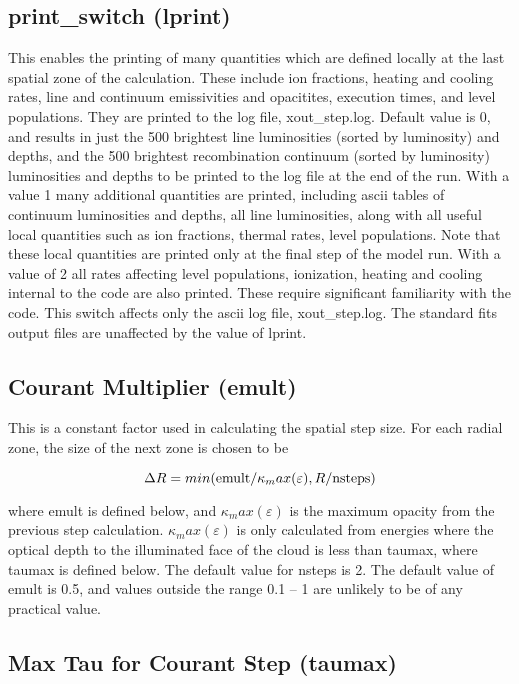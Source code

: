 \subsection{print\_switch (lprint)} This enables 
the printing of many quantities which are defined locally at the last 
spatial zone of the calculation.  These include ion fractions, heating and cooling 
rates, line and continuum emissivities and opacitites, execution times, 
and level populations.  They are printed to the log file, xout\_step.log.
Default value is 0, and results in just the 500 brightest line luminosities (sorted by luminosity) and depths, 
and the 500 brightest recombination continuum (sorted by luminosity)
luminosities and depths to be printed to the log file at the end of the run. With a value 1 many 
additional quantities are printed, including ascii tables of continuum luminosities and depths, 
all line luminosities, along with all useful local quantities such as ion fractions, thermal 
rates, level populations.  Note that these local quantities are printed only at the final step of 
the model run.  With a value of 2 all rates affecting level populations, ionization, heating and 
cooling internal to the code are also printed.  These require significant familiarity with the 
code.  This switch affects only the ascii log file, xout\_step.log.  The standard fits output files 
are unaffected by the value of lprint.

\subsection{Courant Multiplier (emult)}

This is a constant factor used in calculating the spatial step size.  For each 
radial zone, the size of the next zone is chosen to be 

$$\Delta R = min( {\rm emult}/\kappa_max(\varepsilon), R/{\rm nsteps})$$

where emult is defined below, and $\kappa_max(\varepsilon)$ is the maximum opacity from the 
previous step calculation.  $\kappa_max(\varepsilon)$  is only calculated from energies where
the optical depth to the illuminated face of the cloud is less than taumax, where 
taumax is defined below.  The default value for nsteps is 2.
The default value of emult is 0.5, and values outside the range 0.1 -- 1 are 
unlikely to be of any practical value.

\subsection{Max Tau for Courant Step (taumax)}

